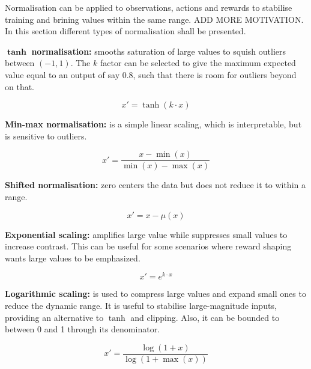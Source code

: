 Normalisation can be applied to observations, actions and rewards to stabilise training and brining values within the same range. ADD MORE MOTIVATION. In this section different types of normalisation shall be presented.

$\mathbf{\tanh}$ \textbf{normalisation:} smooths saturation of large values to squish outliers between $(-1,1)$. The $k$ factor can be selected to give the maximum expected value equal to an output of say 0.8, such that there is room for outliers beyond on that.

\begin{equation}
    x' = \tanh(k \cdot x)
\end{equation}

\textbf{Min-max normalisation:} is a simple linear scaling, which is interpretable, but is sensitive to outliers.

\begin{equation}
    x' = \frac{x - \min(x)}{\min(x) - \max(x)}
\end{equation}

\textbf{Shifted normalisation:} zero centers the data but does not reduce it to within a range.

\begin{equation}
    x' = x - \mu(x)
\end{equation}

\textbf{Exponential scaling:} amplifies large value while suppresses small values to increase contrast. This can be useful for some scenarios where reward shaping wants large values to be emphasized.

\begin{equation}
    x' = e^{k \cdot x}
\end{equation}

\textbf{Logarithmic scaling:} is used to compress large values and expand small ones to reduce the dynamic range. It is useful to stabilise large-magnitude inputs, providing an alternative to $\tanh$ and clipping. Also, it can be bounded to between 0 and 1 through its denominator.

\begin{equation}
    x' = \frac{\log(1 + x)}{\log(1 + \max(x))}
\end{equation}